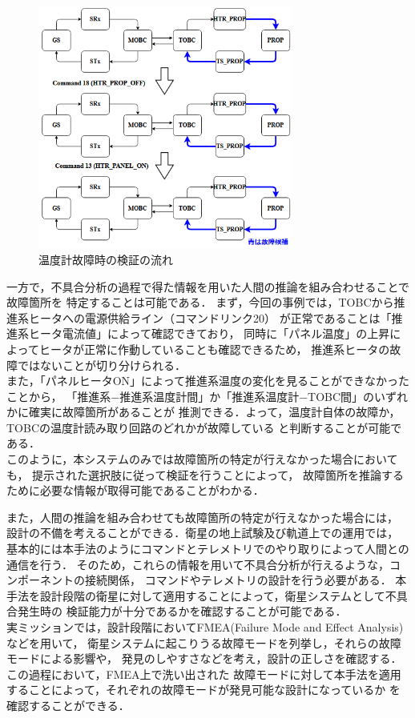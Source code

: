 \documentclass[11pt]{jsreport}
\begin{document}
\begin{figure}[H]
   \centering
      \includegraphics[height=8.0cm]{figure/COM_process_TS_fault.png}
      \caption{温度計故障時の検証の流れ}
      \label{fig:COM_process_TS_fault}
\end{figure}
一方で，不具合分析の過程で得た情報を用いた人間の推論を組み合わせることで故障箇所を
特定することは可能である．
まず，今回の事例では，TOBCから推進系ヒータへの電源供給ライン（コマンドリンク20）
が正常であることは「推進系ヒータ電流値」によって確認できており，
同時に「パネル温度」の上昇によってヒータが正常に作動していることも確認できるため，
推進系ヒータの故障ではないことが切り分けられる．\\
また，「パネルヒータON」によって推進系温度の変化を見ることができなかったことから，
「推進系−推進系温度計間」か「推進系温度計−TOBC間」のいずれかに確実に故障箇所があることが
推測できる．よって，温度計自体の故障か，TOBCの温度計読み取り回路のどれかが故障している
と判断することが可能である．\\
このように，本システムのみでは故障箇所の特定が行えなかった場合においても，
提示された選択肢に従って検証を行うことによって，
故障箇所を推論するために必要な情報が取得可能であることがわかる．


また，人間の推論を組み合わせても故障箇所の特定が行えなかった場合には，
設計の不備を考えることができる．衛星の地上試験及び軌道上での運用では，
基本的には本手法のようにコマンドとテレメトリでのやり取りによって人間との通信を行う．
そのため，これらの情報を用いて不具合分析が行えるような，コンポーネントの接続関係，
コマンドやテレメトリの設計を行う必要がある．
本手法を設計段階の衛星に対して適用することによって，衛星システムとして不具合発生時の
検証能力が十分であるかを確認することが可能である．\\
実ミッションでは，設計段階においてFMEA(Failure Mode and Effect Analysis)などを用いて，
衛星システムに起こりうる故障モードを列挙し，それらの故障モードによる影響や，
発見のしやすさなどを考え，設計の正しさを確認する．
この過程において，FMEA上で洗い出された
故障モードに対して本手法を適用することによって，それぞれの故障モードが発見可能な設計になっているか
を確認することができる．
\end{document}
